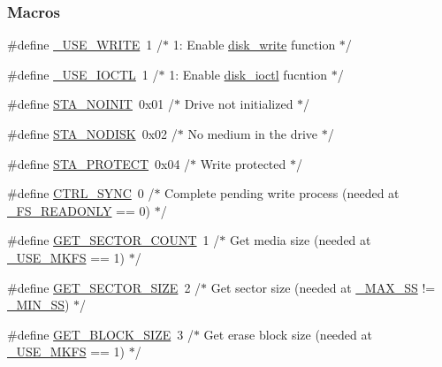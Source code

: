 \subsubsection*{Macros}
\begin{DoxyCompactItemize}
\item 
\#define \hyperlink{diskio_8h_a1dd0d2b46dce637878416d489d2ddde2}{\+\_\+\+U\+S\+E\+\_\+\+W\+R\+I\+T\+E}~1	/$\ast$ 1\+: Enable \hyperlink{diskio_8h_a0fe56ee4831a44b09cfd96856e069634}{disk\+\_\+write} function $\ast$/
\item 
\#define \hyperlink{diskio_8h_afe6d1224687dede333375a2475c78ff6}{\+\_\+\+U\+S\+E\+\_\+\+I\+O\+C\+T\+L}~1	/$\ast$ 1\+: Enable \hyperlink{diskio_8h_ab00fa450a811dbdabe3c655c1a36fab4}{disk\+\_\+ioctl} fucntion $\ast$/
\item 
\#define \hyperlink{diskio_8h_abd6503c70d862b979a3f7080a59e9acd}{S\+T\+A\+\_\+\+N\+O\+I\+N\+I\+T}~0x01	/$\ast$ Drive not initialized $\ast$/
\item 
\#define \hyperlink{diskio_8h_aec625080763d6cf487e550a6c9a2dd19}{S\+T\+A\+\_\+\+N\+O\+D\+I\+S\+K}~0x02	/$\ast$ No medium in the drive $\ast$/
\item 
\#define \hyperlink{diskio_8h_a9ec6dc5f6620a33fabe388d3a111ca8c}{S\+T\+A\+\_\+\+P\+R\+O\+T\+E\+C\+T}~0x04	/$\ast$ Write protected $\ast$/
\item 
\#define \hyperlink{diskio_8h_a1b3c492f9aec325f0655941b75256f3c}{C\+T\+R\+L\+\_\+\+S\+Y\+N\+C}~0	/$\ast$ Complete pending write process (needed at \hyperlink{ffconf_8h_afb8d35370cfe0c23832ac2d82e854ec6}{\+\_\+\+F\+S\+\_\+\+R\+E\+A\+D\+O\+N\+L\+Y} == 0) $\ast$/
\item 
\#define \hyperlink{diskio_8h_a570216006f6a8fc4e1698b1bbb2d1dde}{G\+E\+T\+\_\+\+S\+E\+C\+T\+O\+R\+\_\+\+C\+O\+U\+N\+T}~1	/$\ast$ Get media size (needed at \hyperlink{ffconf_8h_a62cdce547af40f0c1599698ee151bbd7}{\+\_\+\+U\+S\+E\+\_\+\+M\+K\+F\+S} == 1) $\ast$/
\item 
\#define \hyperlink{diskio_8h_ac73b5cf2135cbd459d109b96c9aa346a}{G\+E\+T\+\_\+\+S\+E\+C\+T\+O\+R\+\_\+\+S\+I\+Z\+E}~2	/$\ast$ Get sector size (needed at \hyperlink{ffconf_8h_ac271b697378912f17132cb9c7d0de024}{\+\_\+\+M\+A\+X\+\_\+\+S\+S} != \hyperlink{ffconf_8h_ad03aa6d0e294709ae15898ee2c14dc3a}{\+\_\+\+M\+I\+N\+\_\+\+S\+S}) $\ast$/
\item 
\#define \hyperlink{diskio_8h_aec3bb4dfe075d0ba2f3b07b300a95500}{G\+E\+T\+\_\+\+B\+L\+O\+C\+K\+\_\+\+S\+I\+Z\+E}~3	/$\ast$ Get erase block size (needed at \hyperlink{ffconf_8h_a62cdce547af40f0c1599698ee151bbd7}{\+\_\+\+U\+S\+E\+\_\+\+M\+K\+F\+S} == 1) $\ast$/

\end{DoxyCompactItemize}
